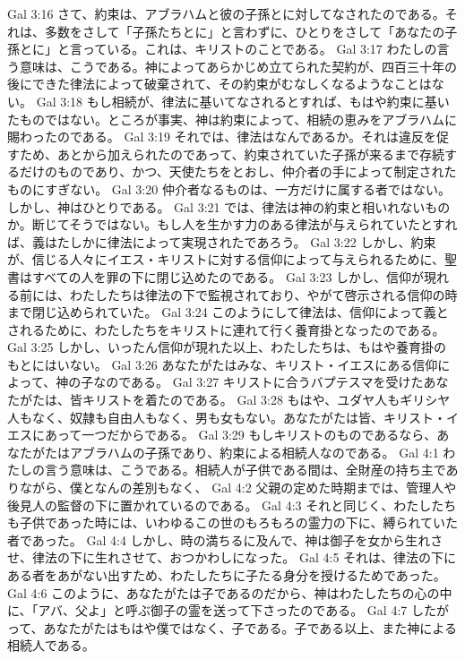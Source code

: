 Gal 3:16  さて、約束は、アブラハムと彼の子孫とに対してなされたのである。それは、多数をさして「子孫たちとに」と言わずに、ひとりをさして「あなたの子孫とに」と言っている。これは、キリストのことである。
Gal 3:17  わたしの言う意味は、こうである。神によってあらかじめ立てられた契約が、四百三十年の後にできた律法によって破棄されて、その約束がむなしくなるようなことはない。
Gal 3:18  もし相続が、律法に基いてなされるとすれば、もはや約束に基いたものではない。ところが事実、神は約束によって、相続の恵みをアブラハムに賜わったのである。
Gal 3:19  それでは、律法はなんであるか。それは違反を促すため、あとから加えられたのであって、約束されていた子孫が来るまで存続するだけのものであり、かつ、天使たちをとおし、仲介者の手によって制定されたものにすぎない。
Gal 3:20  仲介者なるものは、一方だけに属する者ではない。しかし、神はひとりである。
Gal 3:21  では、律法は神の約束と相いれないものか。断じてそうではない。もし人を生かす力のある律法が与えられていたとすれば、義はたしかに律法によって実現されたであろう。
Gal 3:22  しかし、約束が、信じる人々にイエス・キリストに対する信仰によって与えられるために、聖書はすべての人を罪の下に閉じ込めたのである。
Gal 3:23  しかし、信仰が現れる前には、わたしたちは律法の下で監視されており、やがて啓示される信仰の時まで閉じ込められていた。
Gal 3:24  このようにして律法は、信仰によって義とされるために、わたしたちをキリストに連れて行く養育掛となったのである。
Gal 3:25  しかし、いったん信仰が現れた以上、わたしたちは、もはや養育掛のもとにはいない。
Gal 3:26  あなたがたはみな、キリスト・イエスにある信仰によって、神の子なのである。
Gal 3:27  キリストに合うバプテスマを受けたあなたがたは、皆キリストを着たのである。
Gal 3:28  もはや、ユダヤ人もギリシヤ人もなく、奴隷も自由人もなく、男も女もない。あなたがたは皆、キリスト・イエスにあって一つだからである。
Gal 3:29  もしキリストのものであるなら、あなたがたはアブラハムの子孫であり、約束による相続人なのである。
Gal 4:1  わたしの言う意味は、こうである。相続人が子供である間は、全財産の持ち主でありながら、僕となんの差別もなく、
Gal 4:2  父親の定めた時期までは、管理人や後見人の監督の下に置かれているのである。
Gal 4:3  それと同じく、わたしたちも子供であった時には、いわゆるこの世のもろもろの霊力の下に、縛られていた者であった。
Gal 4:4  しかし、時の満ちるに及んで、神は御子を女から生れさせ、律法の下に生れさせて、おつかわしになった。
Gal 4:5  それは、律法の下にある者をあがない出すため、わたしたちに子たる身分を授けるためであった。
Gal 4:6  このように、あなたがたは子であるのだから、神はわたしたちの心の中に、「アバ、父よ」と呼ぶ御子の霊を送って下さったのである。
Gal 4:7  したがって、あなたがたはもはや僕ではなく、子である。子である以上、また神による相続人である。
